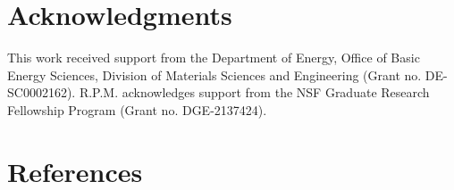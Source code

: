 \documentclass[aip, jcp, reprint, onecolumn]{revtex4-2}
\begin{document}
\section{Acknowledgments}
This work received support from the Department of Energy, Office of Basic Energy Sciences, Division of Materials Sciences and Engineering (Grant no. DE-SC0002162).
R.P.M. acknowledges support from the NSF Graduate Research Fellowship Program (Grant no. DGE-2137424). 


\section{References}

\end{document}
